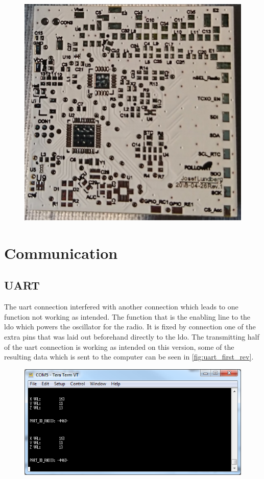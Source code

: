 \begin{figure}[H]
	\centering
    \includegraphics[width=.8\linewidth]{Figures/PWB}
	\label{fig:pcbr1}
\end{figure}

\section{Communication}

\subsection{UART}
The \gls{uart} connection interfered with another connection which leads to one function not working as intended. The function that is the enabling line to the \gls{ldo} which powers the oscillator for the radio. It is fixed by connection one of the extra pins that was laid out beforehand directly to the \gls{ldo}. The transmitting half of the \gls{uart} connection is working as intended on this version, some of the resulting data which is sent to the computer can be seen in \autoref{fig:uart_first_rev}.

\begin{figure}[H] 
    \centering 
    \includegraphics[width=.8\linewidth]{Figures/uart_first_rev} 
    \label{fig:uart_first_rev} 
\end{figure} 

